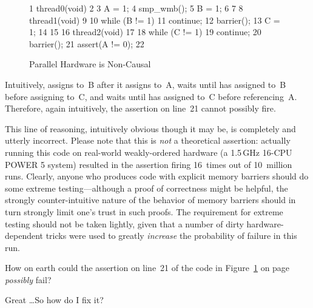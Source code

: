 \begin{figure}[htbp]
{ \scriptsize
\begin{verbbox}
  1 thread0(void)
  2 {
  3   A = 1;
  4   smp_wmb();
  5   B = 1;
  6 }
  7
  8 thread1(void)
  9 {
 10   while (B != 1)
 11     continue;
 12   barrier();
 13   C = 1;
 14 }
 15
 16 thread2(void)
 17 {
 18   while (C != 1)
 19     continue;
 20   barrier();
 21   assert(A != 0);
 22 }
\end{verbbox}
}
\centering
\theverbbox
\caption{Parallel Hardware is Non-Causal}
\label{fig:advsync:Parallel Hardware is Non-Causal}
\end{figure}

Intuitively,  assigns to~B after it assigns to~A,
 waits until  has assigned to~B before
assigning to~C, and  waits until  has
assigned to~C before referencing~A.
Therefore, again intuitively, the assertion on line~21 cannot possibly
fire.

This line of reasoning, intuitively obvious though it may be, is completely
and utterly incorrect.
Please note that this is \emph{not} a theoretical assertion:
actually running this code on real-world weakly-ordered hardware
(a 1.5\,GHz 16-CPU POWER 5 system) resulted in the assertion firing
16~times out of 10~million runs.
Clearly, anyone who produces code with explicit memory barriers
should do some extreme testing---although a proof of correctness might
be helpful, the strongly counter-intuitive nature of the behavior of
memory barriers should in turn strongly limit one's trust in such proofs.
The requirement for extreme testing should not be taken lightly, given
that a number of dirty hardware-dependent tricks were used to
greatly \emph{increase} the probability of failure in this run.

\QuickQuiz{}
	How on earth could the assertion on line~21 of the code in
	Figure~\ref{fig:advsync:Parallel Hardware is Non-Causal} on
	page~\pageref{fig:advsync:Parallel Hardware is Non-Causal}
	\emph{possibly} fail?
 \QuickQuizEnd

\QuickQuiz{}
	Great \ldots So how do I fix it?
 \QuickQuizEnd

